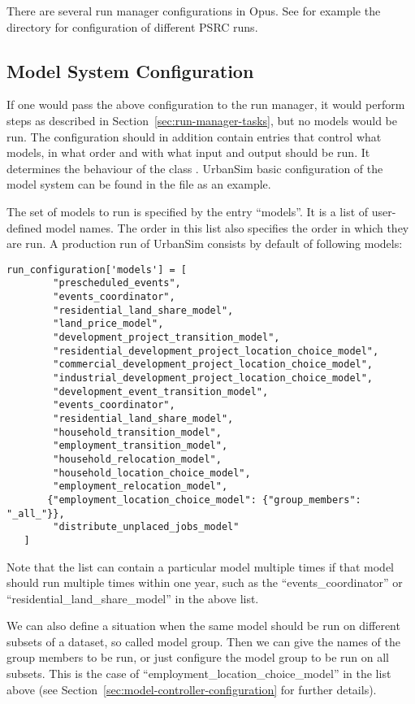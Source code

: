 There are several run manager \runmanagerindex configurations in Opus. See for example the
directory  for configuration of different PSRC \psrcindex runs.

\subsection{Model System Configuration}
\label{sec:model-system-configuration}
%
If one would pass the above configuration to the run manager, \runmanagerindex it would perform
steps as described in Section~\ref{sec:run-manager-tasks}, but no models would
be run. The configuration should in addition contain entries that control what
models, in what order and with what input and output should be run. It
determines the behaviour of the class . UrbanSim basic
configuration of the model system can be found in the file
 as an example.

The set of models to run is specified by the entry ``models''. It is a list of
user-defined model names. The order in this list also specifies the order in
which they are run. A production run of UrbanSim consists by default of
following models: 
\begin{verbatim}
run_configuration['models'] = [
        "prescheduled_events",
        "events_coordinator",
        "residential_land_share_model",
        "land_price_model",
        "development_project_transition_model",
        "residential_development_project_location_choice_model",
        "commercial_development_project_location_choice_model",
        "industrial_development_project_location_choice_model",
        "development_event_transition_model",
        "events_coordinator",
        "residential_land_share_model",
        "household_transition_model",
        "employment_transition_model",
        "household_relocation_model",
        "household_location_choice_model",
        "employment_relocation_model", 
       {"employment_location_choice_model": {"group_members": "_all_"}},
        "distribute_unplaced_jobs_model"
   ]
\end{verbatim}
Note that the list can contain a particular model multiple times if that model should
run multiple times within one year, such as the ``events_coordinator'' or
``residential_land_share_model'' in the above list.

We can also define a situation when the same model should be run on different subsets of 
a dataset, so called model group. Then we can give the names of the group members to be run, or 
just configure the model group to be run on all subsets. This is the case of ``employment_location_choice_model''
in the list above (see Section~\ref{sec:model-controller-configuration} for further details).
 
